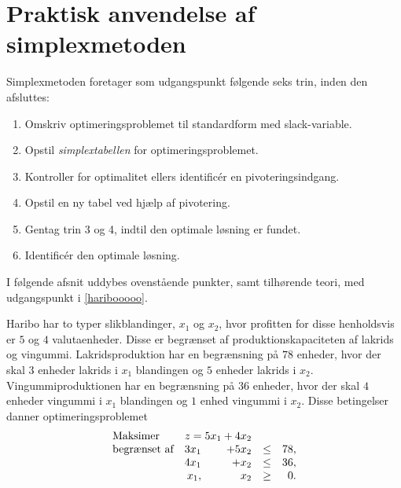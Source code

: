 \section{Praktisk anvendelse af simplexmetoden}
\label{afsnittet}
Simplexmetoden foretager som udgangspunkt følgende seks trin, inden den afsluttes:
%
\begin{tcolorbox}[
title=Simplexmetoden,
colback		= myblue!15,
colframe	= myblue!15,
coltitle	= black,
before skip	= 20pt plus 2pt,
after skip	= 20pt plus 2pt,
fonttitle	= \bfseries]
\begin{enumerate}
\item Omskriv optimeringsproblemet til standardform med slack-variable.  %
\item Opstil \textit{simplextabellen} for optimeringsproblemet.					 %
\item Kontroller for optimalitet ellers identificér en pivoteringsindgang.					 %
\item Opstil en ny tabel ved hjælp af pivotering. 						 %
\item Gentag trin 3 og 4, indtil den optimale løsning er fundet. 					 %
\item Identificér den optimale løsning.									 %
\end{enumerate}
%
\end{tcolorbox}
\noindent
%
I følgende afsnit uddybes ovenstående punkter, samt tilhørende teori, med udgangspunkt i \ref{haribooooo}.
%
\\
%
\begin{eks}
\label{haribooooo}
Haribo har to typer slikblandinger, $x_1$ og $x_2$, hvor profitten for disse henholdsvis er $5$ og $4$ valutaenheder.
Disse er begrænset af produktionskapaciteten af lakrids og vingummi.
Lakridsproduktion har en begrænsning på $78$ enheder, hvor der skal $3$ enheder lakrids i $x_1$ blandingen og $5$ enheder lakrids i $x_2$.
Vingummiproduktionen har en begrænsning på $36$ enheder, hvor der skal $4$ enheder vingummi i $x_1$ blandingen og $1$ enhed vingummi i $x_2$. 
%
Disse betingelser danner optimeringsproblemet
%
\begin{align*}
\begin{array}{lrrlr} 
\text{Maksimer}		&	\multicolumn{2}{c}{z=5x_1+4x_2}  &\\
\text{begrænset af}	&3x_1& +5x_2			&\leq 	&78,\\
					&4x_1& + x_2				&\leq	& 36,\\
					&x_1,& x_2				&\geq	& 0.
\end{array}
\end{align*}
%
\end{eks}
%
